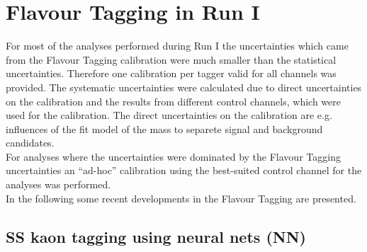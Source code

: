\documentclass{PoS}
\begin{document}
\section{Flavour Tagging in Run I}\label{sec:4}

For most of the analyses performed during Run I the uncertainties which came from the Flavour Tagging calibration were much smaller than the statistical uncertainties. Therefore one calibration per tagger valid for all channels was provided. The systematic uncertainties were calculated due to direct uncertainties on the calibration and the results from different control channels, which were used for the calibration. The direct uncertainties on the calibration are e.g. influences of the fit model of the mass to separete signal and background candidates.\\
For analyses where the uncertainties were dominated by the Flavour Tagging uncertainties an \enquote{ad-hoc} calibration using the best-suited control channel for the analyses was performed. \\
In the following some recent developments in the Flavour Tagging are presented.

\subsection{SS kaon tagging using neural nets (NN)}
\end{document}
